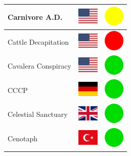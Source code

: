 \documentclass[12pt, a4paper, twoside]{report}
\begin{document}
\begin{center}
\begin{longtable}{|p{5cm}|p{2cm}|p{2cm}|}
 Carnivore A.D.                                             & \includegraphics[width=1cm]{../img/flags/us} &   \includegraphics[width=1cm]{../likes/m} \\ \hline
 Cattle Decapitation                                        & \includegraphics[width=1cm]{../img/flags/us} &   \includegraphics[width=1cm]{../likes/n} \\ \hline
 Cavalera Conspiracy                                        & \includegraphics[width=1cm]{../img/flags/us} &   \includegraphics[width=1cm]{../likes/y} \\ \hline
 CCCP                                                       & \includegraphics[width=1cm]{../img/flags/de} &   \includegraphics[width=1cm]{../likes/y} \\ \hline
 Celestial Sanctuary                                        & \includegraphics[width=1cm]{../img/flags/gb} &   \includegraphics[width=1cm]{../likes/y} \\ \hline
 Cenotaph                                                   & \includegraphics[width=1cm]{../img/flags/tr} &   \includegraphics[width=1cm]{../likes/y} \\ \hline

\end{longtable}
\end{center}
\end{document}

